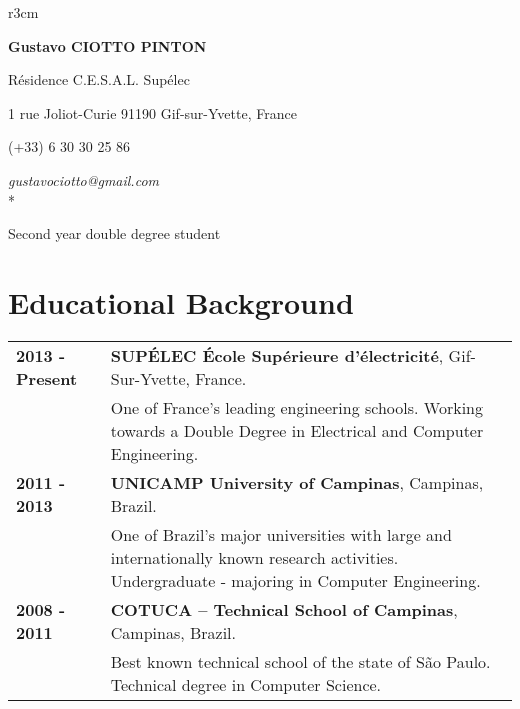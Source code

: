 \documentclass[10pt, a4paper]{article}
\author{Gustavo Ciotto Pinton}
\begin{document}
\pagestyle{empty} 

\begin{wrapfigure}{r}{3cm}
  \vspace{-20pt}
  \begin{center}
  \end{center}
\end{wrapfigure}

\textbf{\LARGE Gustavo CIOTTO PINTON}

Résidence C.E.S.A.L. Supélec

1 rue Joliot-Curie 91190 Gif-sur-Yvette, France

(+33) 6 30 30 25 86	


\textit{gustavociotto@gmail.com} \\*

{\centerline {\large Second year double degree student}} %


\section{Educational Background}

\begin{tabular}{p{} p{}}

 \textbf{2013 - Present} & \textbf{SUPÉLEC  École Supérieure d'électricité},
 Gif-Sur-Yvette, France. \\
 & One of France's leading engineering schools. Working towards a Double Degree
 in Electrical and Computer Engineering. \\

 \textbf{2011 - 2013} & \textbf{UNICAMP University of Campinas}, Campinas,
 Brazil.
 \\
 & One of Brazil’s major universities with large and internationally known
 research activities. Undergraduate - majoring in Computer
 Engineering.
 \\
 
 
 \textbf{2008 - 2011} & \textbf{COTUCA – Technical School of Campinas},
 Campinas, Brazil. \\
 & Best known technical school of the state of São Paulo. Technical degree in
 Computer Science.  \\
\end{tabular}
\end{document}
